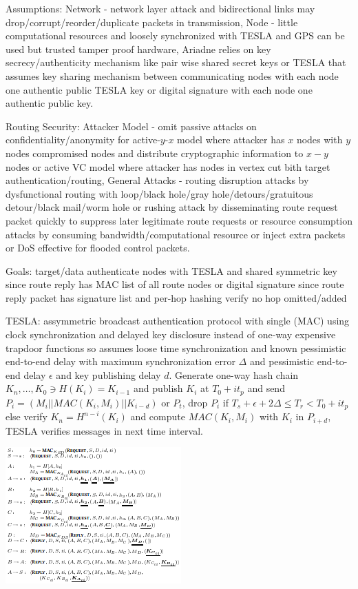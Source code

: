 \documentclass[9pt]{extarticle}
\begin{document}
\begin{multicols}{2}
Assumptions: Network - network layer attack and bidirectional links may drop/corrupt/reorder/duplicate packets in transmission, Node - little computational resources and loosely synchronized with TESLA and GPS can be used but trusted tamper proof hardware, Ariadne relies on key secrecy/authenticity mechanism like pair wise shared secret keys or TESLA that assumes key sharing mechanism between communicating nodes with each node one authentic public TESLA key or digital signature with each node one authentic public key.

Routing Security: Attacker Model - omit passive attacks on confidentiality/anonymity for active-$y$-$x$ model where attacker has $x$ nodes with $y$ nodes compromised nodes and distribute cryptographic information to $x-y$ nodes or active VC model where attacker has nodes in vertex cut bith target authentication/routing, General Attacks - routing disruption attacks by dysfunctional routing with loop/black hole/gray hole/detours/gratuitous detour/black mail/worm hole or rushing attack by disseminating route request packet quickly to suppress later legitimate route requests or resource consumption attacks by consuming bandwidth/computational resource or inject extra packets or DoS effective for flooded control packets.

Goals: target/data authenticate nodes with TESLA and shared symmetric key since route reply has MAC list of all route nodes or digital signature since route reply packet has signature list and per-hop hashing verify  no hop omitted/added

TESLA: assymmetric broadcast authentication protocol with single (MAC) using clock synchronization and delayed key
disclosure instead of one-way expensive trapdoor functions so assumes loose time synchronization and known
pessimistic end-to-end delay with maximum synchronization error $\Delta$ and pessimistic end-to-end delay $\epsilon$ and key publishing delay $d$. Generate one-way hash chain $K_n,\dots,K_0\ni{H(K_i)=K_{i-1}}$ and publish $K_i$ at $T_0+it_p$ and send $P_i=(M_i||MAC(K_i, M_i)||K_{i-d})$ or $P_t$, drop $P_i$ if ${T_s+\epsilon+2\Delta}\leq{T_r}<T_0+it_p$ else verify $K_n=H^{n-i}(K_i)$ and compute $MAC(K_i,M_i)$ with $K_i$ in $P_{i+d}$, TESLA verifies messages in next time interval. 

\includegraphics{ariadnerreq.png}


\end{multicols}
\end{document}
